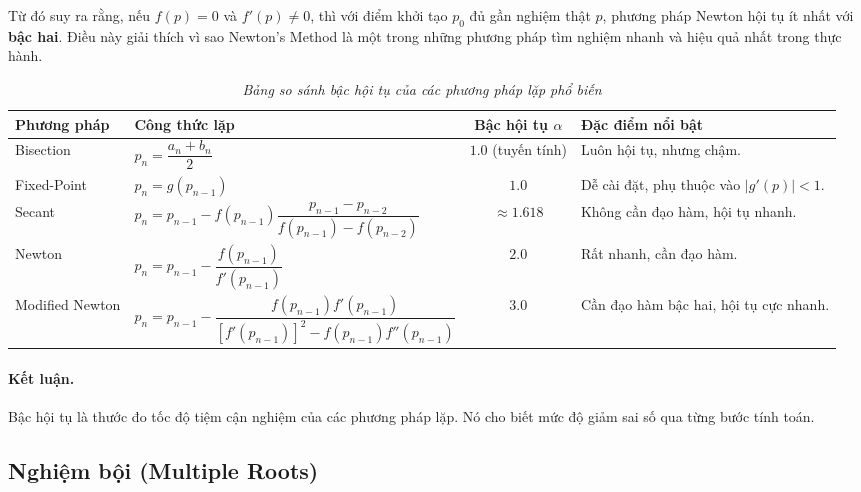 Từ đó suy ra rằng, nếu $f(p) = 0$ và $f'(p) \ne 0$, 
thì với điểm khởi tạo $p_0$ đủ gần nghiệm thật $p$, 
phương pháp Newton hội tụ ít nhất với \textbf{bậc hai}. 
Điều này giải thích vì sao Newton’s Method 
là một trong những phương pháp tìm nghiệm nhanh và hiệu quả nhất trong thực hành.

\captionsetup[table]{skip=10pt}
\begin{table}[H]
\centering
\caption{\textit{Bảng so sánh bậc hội tụ của các phương pháp lặp phổ biến}}
\label{tab:order_of_convergence}
\begin{adjustbox}{max width=\textwidth}
\renewcommand{\arraystretch}{1.3} %
\begin{tabularx}{\textwidth}{|l|>{\centering\arraybackslash}X|c|X|}
\hline
\textbf{Phương pháp} &
\textbf{Công thức lặp} &
\textbf{Bậc hội tụ $\alpha$} &
\textbf{Đặc điểm nổi bật} \\ \hline

Bisection &
$p_{n} = \dfrac{a_n + b_n}{2}$ &
$1.0$ (tuyến tính) &
Luôn hội tụ, nhưng chậm. \\ \hline

Fixed-Point &
$p_n = g(p_{n-1})$ &
$1.0$ &
Dễ cài đặt, phụ thuộc vào $|g'(p)| < 1$. \\ \hline

Secant &
$p_n = p_{n-1} - f(p_{n-1}) 
\dfrac{p_{n-1} - p_{n-2}}{f(p_{n-1}) - f(p_{n-2})}$ &
$\approx 1.618$ &
Không cần đạo hàm, hội tụ nhanh. \\ \hline

Newton &
$p_n = p_{n-1} - \dfrac{f(p_{n-1})}{f'(p_{n-1})}$ &
$2.0$ &
Rất nhanh, cần đạo hàm. \\ \hline

Modified Newton &
$p_n = p_{n-1} -
\dfrac{f(p_{n-1}) f'(p_{n-1})}
{[f'(p_{n-1})]^2 - f(p_{n-1}) f''(p_{n-1})}$ &
$3.0$ &
Cần đạo hàm bậc hai, hội tụ cực nhanh. \\ \hline
\end{tabularx}
\end{adjustbox}
\end{table}

\paragraph*{Kết luận.}
Bậc hội tụ là thước đo tốc độ tiệm cận nghiệm của các phương pháp lặp. 
Nó cho biết mức độ giảm sai số qua từng bước tính toán.

\subsection{Nghiệm bội (Multiple Roots)}

